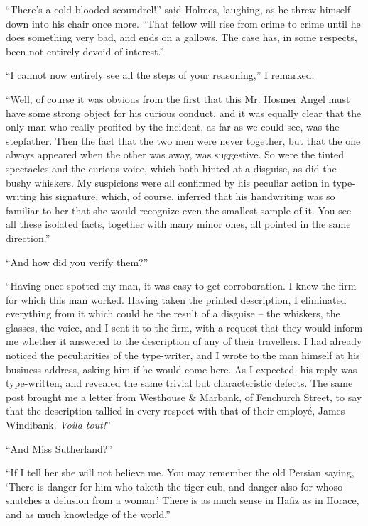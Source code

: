 “There’s a cold-blooded scoundrel!” said Holmes, laughing,
as he threw himself down into his chair once more. “That
fellow will rise from crime to crime until he does something
very bad, and ends on a gallows. The case has, in some respects,
been not entirely devoid of interest.”

“I cannot now entirely see all the steps of your reasoning,”
I remarked.

“Well, of course it was obvious from the first that this Mr.
Hosmer Angel must have some strong object for his curious
conduct, and it was equally clear that the only man who really
profited by the incident, as far as we could see, was the
stepfather. Then the fact that the two men were never together,
but that the one always appeared when the other was away,
was suggestive. So were the tinted spectacles and the curious
voice, which both hinted at a disguise, as did the bushy
whiskers. My suspicions were all confirmed by his peculiar
action in type-writing his signature, which, of course, inferred
that his handwriting was so familiar to her that she would
recognize even the smallest sample of it. You see all these
isolated facts, together with many minor ones, all pointed in
the same direction.”

“And how did you verify them?”

“Having once spotted my man, it was easy to get corroboration.
I knew the firm for which this man worked. Having
taken the printed description, I eliminated everything from it
which could be the result of a disguise -- the whiskers, the
glasses, the voice, and I sent it to the firm, with a request that
they would inform me whether it answered to the description
of any of their travellers. I had already noticed the peculiarities
of the type-writer, and I wrote to the man himself at his
business address, asking him if he would come here. As I
expected, his reply was type-written, and revealed the same
trivial but characteristic defects. The same post brought me
a letter from Westhouse \& Marbank, of Fenchurch Street, to
say that the description tallied in every respect with that of
their employé, James Windibank. \textit{Voila tout!}”

“And Miss Sutherland?”

“If I tell her she will not believe me. You may remember
the old Persian saying, ‘There is danger for him who taketh
the tiger cub, and danger also for whoso snatches a delusion
from a woman.’ There is as much sense in Hafiz as in Horace,
and as much knowledge of the world.”

